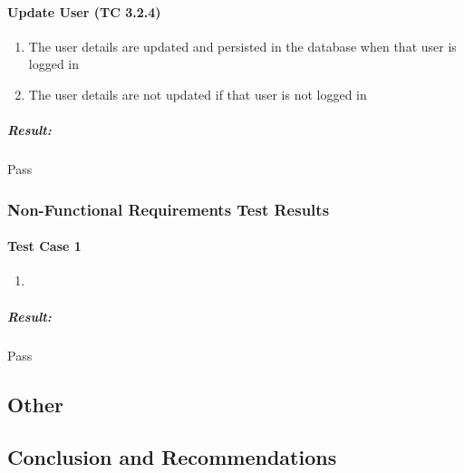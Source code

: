 \documentclass{article}
\begin{document}
			\paragraph{Update User (TC 3.2.4)}
				\begin{enumerate}
					\item The user details are updated and persisted in the database when that user is logged in
					\item The user details are not updated if that user is not logged in
				\end{enumerate}
				\subparagraph{Result: } Pass
			
		\subsubsection{Non-Functional Requirements Test Results}
			\paragraph{Test Case 1}
				\begin{enumerate}
					\item 
				\end{enumerate}
				\subparagraph{Result: } Pass
	\subsection{Other}
	\subsection{Conclusion and Recommendations}
\end{document}
